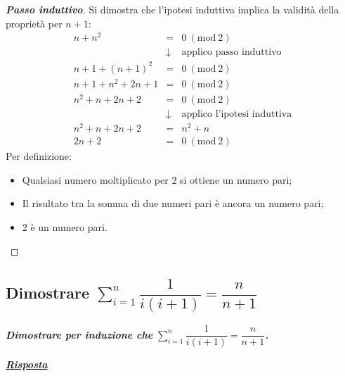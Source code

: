 \documentclass[a4paper]{article}
\begin{document}
	\begin{proof}[\textbf{Passo induttivo}]
		Si dimostra che l'ipotesi induttiva implica la validità della proprietà per $n+1$:
		\begin{equation*}
			\begin{array}{rcl}
				n+n^{2} &=& 0 \: \left(\mathrm{mod} \: 2\right) \\ [.3em]
				&\downarrow& \text{applico passo induttivo} \\ [.3em]    
				n+1 + \left(n+1\right)^{2} &=& 0 \: \left(\mathrm{mod} \: 2\right) \\ [.3em]
				n + 1 + n^{2} + 2n + 1 &=& 0  \: \left(\mathrm{mod} \: 2\right) \\ [.3em]
				n^{2} + n + 2n + 2 &=& 0 \: \left(\mathrm{mod} \: 2\right) \\ [.3em]
				&\downarrow& \text{applico l'ipotesi induttiva} \\ [.3em]
				n^{2} + n + 2n + 2 &=& n^{2} + n \\ [.3em]
				2n + 2 &=& 0 \: \left(\mathrm{mod} \: 2\right)
			\end{array}
		\end{equation*}
		Per definizione:
		\begin{itemize}
			\item Qualsiasi numero moltiplicato per $2$ si ottiene un numero pari;
			\item Il risultato tra la somma di due numeri pari è ancora un numero pari;
			\item $2$ è un numero pari.
		\end{itemize}
	\end{proof}\newpage
	
	\subsection{Dimostrare $\displaystyle\sum_{i=1}^{n}\dfrac{1}{i\left(i+1\right)} = \dfrac{n}{n+1}$}
	\textcolor{Red3}{\textbf{\emph{Dimostrare per induzione che }}$\displaystyle\sum_{i=1}^{n}\dfrac{1}{i\left(i+1\right)} = \dfrac{n}{n+1}$\textbf{\emph{.}}}\newline
	
	\noindent
	\textcolor{Green4}{\textbf{\emph{\underline{Risposta}}}}\newline
	
\end{document}
